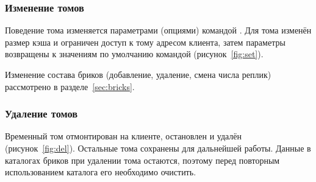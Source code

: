 \subsubsection{Изменение томов}

Поведение тома изменяется параметрами (опциями) командой . Для тома  изменён размер кэша и ограничен доступ к тому адресом клиента, затем параметры возвращены к значениям по умолчанию командой  (рисунок~\ref{fig:set}).

Изменение состава бриков (добавление, удаление, смена числа реплик) рассмотрено в разделе~\ref{sec:bricks}.

\subsubsection{Удаление томов}

Временный том  отмонтирован на клиенте, остановлен и удалён (рисунок~\ref{fig:del}). Остальные тома сохранены для дальнейшей работы. Данные в каталогах бриков при удалении тома остаются, поэтому перед повторным использованием каталога его необходимо очистить.
